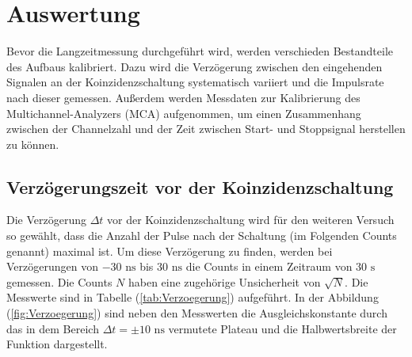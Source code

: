 \section{Auswertung}
\label{sec:Auswertung}
Bevor die Langzeitmessung durchgeführt wird, werden verschieden
Bestandteile des Aufbaus kalibriert. Dazu wird die Verzögerung 
zwischen den eingehenden Signalen an der Koinzidenzschaltung 
systematisch variiert und die Impulsrate nach dieser gemessen. 
Außerdem werden Messdaten zur Kalibrierung des Multichannel-Analyzers 
(MCA) aufgenommen, um einen Zusammenhang zwischen der Channelzahl und 
der Zeit zwischen Start- und Stoppsignal herstellen zu können.
\FloatBarrier
\subsection{Verzögerungszeit vor der Koinzidenzschaltung}
Die Verzögerung $\Delta t $ vor der Koinzidenzschaltung wird für 
den weiteren Versuch so gewählt, dass die 
Anzahl der Pulse nach der Schaltung (im Folgenden Counts genannt)
 maximal ist. Um diese Verzögerung 
zu finden, werden bei Verzögerungen von $-30 \,\, \unit{\nano\second}$ bis 
$30 \,\, \unit{\nano\second}$ die Counts in einem 
Zeitraum von $30 \,\, \unit{\second}$ gemessen. 
Die Counts $N$ haben eine zugehörige 
Unsicherheit von $\sqrt{N}$. 
Die Messwerte sind in Tabelle (\ref{tab:Verzoegerung}) aufgeführt. In
der Abbildung (\ref{fig:Verzoegerung}) sind neben den Messwerten die
Ausgleichskonstante durch das in dem Bereich 
$\Delta t = \pm 10 \,\, \unit{\nano\second}$ vermutete Plateau und die 
Halbwertsbreite der Funktion dargestellt.     

